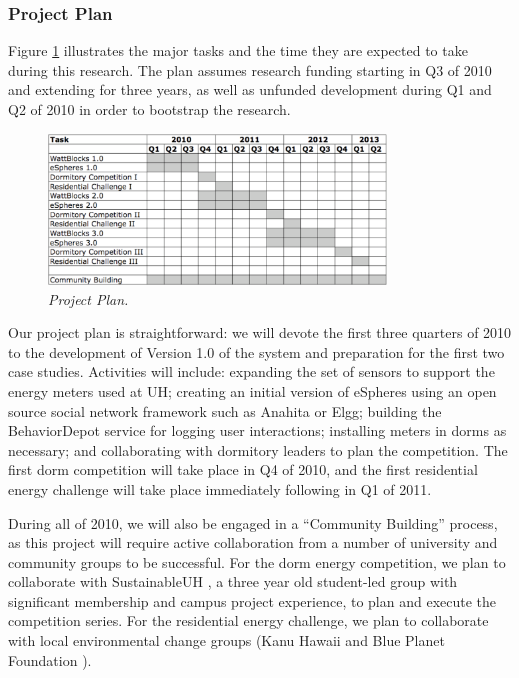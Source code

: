 \subsubsection{Project Plan}
\label{sec:plan}

Figure \ref{fig:plan} illustrates the major tasks and the time they are
expected to take during this research.  The plan assumes research funding
starting in Q3 of 2010 and extending for three years, as well as unfunded
development during Q1 and Q2 of 2010 in order to bootstrap the
research.

\begin{figure}[th]
  \center
  \includegraphics[width=0.8\textwidth]{gantt.eps}
  \caption{\em \small Project Plan.}
 \label{fig:plan}
\end{figure} 

Our project plan is straightforward: we will devote the first three
quarters of 2010 to the development of Version 1.0 of the system and
preparation for the first two case studies.  Activities will include:
expanding the set of sensors to support the energy meters used at UH;
creating an initial version of eSpheres using an open source social network
framework such as Anahita or Elgg; building the BehaviorDepot service for
logging user interactions; installing meters in dorms as necessary; and
collaborating with dormitory leaders to plan the competition. The first
dorm competition will take place in Q4 of 2010, and the first residential
energy challenge will take place immediately following in Q1 of 2011.

During all of 2010, we will also be engaged in a ``Community Building''
process, as this project will require active collaboration from a number of
university and community groups to be successful.  For the dorm energy
competition, we plan to collaborate with SustainableUH
\cite{SustainableUH}, a three year old student-led group with significant
membership and campus project experience, to plan and execute the
competition series.  For the residential energy challenge, we plan to
collaborate with local environmental change groups (Kanu Hawaii
\cite{KanuHawaii} and Blue Planet Foundation \cite{BluePlanetFoundation}).

